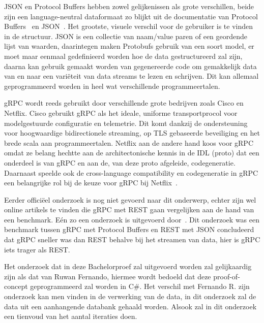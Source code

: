 JSON en Protocol Buffers hebben zowel gelijkenissen als grote verschillen, beide zijn een language-neutral dataformaat zo blijkt uit de documentatie van Protocol Buffers~\autocite{Google} en  JSON~\autocite{Crockford}. Het grootste, visuele verschil voor de gebruiker is te vinden in de structuur. JSON is een collectie van naam/value paren of een geordende lijst van waarden, daarintegen maken Protobufs gebruik van een soort model, er moet maar eenmaal gedefinieerd worden hoe de data gestructureerd zal zijn, daarna kan gebruik gemaakt worden van gegenereerde code om gemakkelijk data van en naar een variëteit van data streams te lezen en schrijven. Dit kan allemaal geprogrammeerd worden in heel wat verschillende programmeertalen.

gRPC wordt reeds gebruikt door verschillende grote bedrijven zoals Cisco en Netflix. 
Cisco gebruikt gRPC als het ideale, uniforme transportprocol voor modelgestuurde configuratie en telemetrie. Dit komt dankzij de ondersteuning voor hoogwaardige bidirectionele streaming, op TLS gebaseerde beveiliging en het brede scala aan programmeertalen. 
Netflix aan de andere hand koos voor gRPC omdat ze belang hechtte aan de architectonische kennis in de IDL (proto) dat een onderdeel is van gRPC en aan de, van deze proto afgeleide, codegeneratie. Daarnaast speelde ook de cross-language compatibility en codegeneratie in gRPC een belangrijke rol bij de keuze voor gRPC bij Netflix~\autocite{Foundation2018}.

Eerder officiëel onderzoek is nog niet gevoerd naar dit onderwerp, echter zijn wel online artikels te vinden die gRPC met REST gaan vergelijken aan de hand van een benchmark. Eén zo een onderzoek is uitgevoerd door~\textcite{Fernando2019}. Dit onderzoek was een benchmark tussen gRPC met Protocol Buffers en REST met JSON concludeerd dat gRPC sneller was dan REST behalve bij het streamen van data, hier is gRPC iets trager als REST.

Het onderzoek dat in deze Bachelorproef zal uitgevoerd worden zal gelijkaardig zijn als dat van Ruwan Fernando, hiermee wordt bedoeld dat deze proof-of-concept geprogrammeerd zal worden in C\#. Het verschil met Fernando R. zijn onderzoek kan men vinden in de verwerking van de data, in dit onderzoek zal de data uit een aanhangende databank gehaald worden. Alsook zal in dit onderzoek een tienvoud van het aantal iteraties doen.


